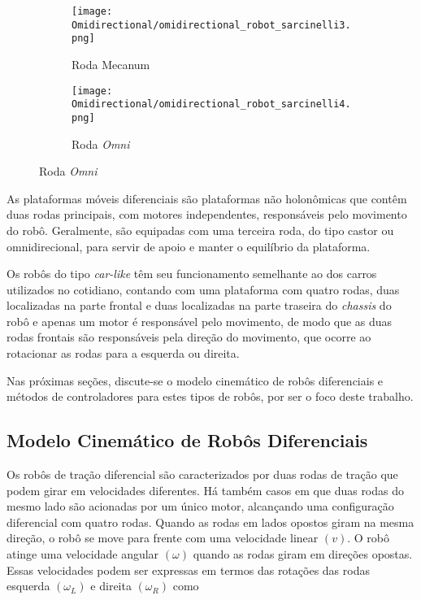 \begin{figure}[htb]
    \caption{Rodas de Robôs Omnidirecionais}
    \centering    
    \begin{subfigure}[b]{0.2\textwidth}
        \texttt{[image: Omidirectional/omidirectional\_robot\_sarcinelli3.png]}
        \caption{Roda Mecanum}
    \end{subfigure}
    \hspace{0.1\textwidth}
    \begin{subfigure}[b]{0.2\textwidth}
        \texttt{[image: Omidirectional/omidirectional\_robot\_sarcinelli4.png]}
        \caption{Roda \textit{Omni}}
    \end{subfigure}
    \source
    \label{fig:rodas_omnidirecionais}
\end{figure}


As plataformas móveis diferenciais são plataformas não holonômicas que contêm duas rodas principais, com motores independentes, responsáveis pelo movimento do robô. Geralmente, são equipadas com uma terceira roda, do tipo castor ou omnidirecional, para servir de apoio e manter o equilíbrio da plataforma.

Os robôs do tipo \textit{car-like} têm seu funcionamento semelhante ao dos carros utilizados no cotidiano, contando com uma plataforma com quatro rodas, duas localizadas na parte frontal e duas localizadas na parte traseira do \textit{chassis} do robô e apenas um motor é responsável pelo movimento, de modo que as duas rodas frontais são responsáveis pela direção do movimento, que ocorre ao rotacionar as rodas para a esquerda ou direita.

Nas próximas seções, discute-se o modelo cinemático de robôs diferenciais e métodos de controladores para estes tipos de robôs, por ser o foco deste trabalho.


    \subsection{Modelo Cinemático de Robôs Diferenciais}
    \label{sec:Modelo_Robos_Diferenciais}
    Os robôs de tração diferencial são caracterizados por duas rodas de tração que podem girar em velocidades diferentes. Há também casos em que duas rodas do mesmo lado são acionadas por um único motor, alcançando uma configuração diferencial com quatro rodas. Quando as rodas em lados opostos giram na mesma direção, o robô se move para frente com uma velocidade linear $(v)$. O robô atinge uma velocidade angular $(\omega)$ quando as rodas giram em direções opostas. Essas velocidades podem ser expressas em termos das rotações das rodas esquerda $(\omega_L)$ e direita $(\omega_R)$ como
    
